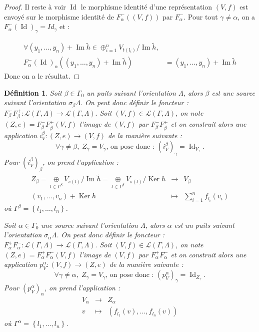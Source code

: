 \documentclass[a4paper,10pt]{article}
\newtheorem{defi}[]{Définition}[section]
\DeclareMathOperator{\Ker}{Ker}
\DeclareMathOperator{\Id}{Id}
\DeclareMathOperator{\Img}{Im}
\begin{document}
\begin{proof}
 Il reste à voir $\Id$ le morphisme identité d'une représentation $(V,f)$ est envoyé sur le morphisme identité de $F^{-}_{\alpha}((V,f))$ par $F^{-}_{\alpha}$. Pour tout $\gamma \neq \alpha$, on a $F^{-}_{\alpha}(\Id)_{\gamma} = Id_{\gamma}$ et : 

\[
\begin{array}{rl}
  \forall (y_{1}, \dots, y_{n}) + \Img \widetilde{h} \in \oplus_{i=1}^{n} V_{t(l_{i})} / \Img \widetilde{h},& \\
F^{-}_{\alpha}(\Id)_{\alpha}((y_{1}, \dots, y_{n}) + \Img \widetilde{h}) &= (y_{1}, \dots, y_{n}) + \Img \widetilde{h}
\end{array}
\]
Donc on a le résultat.
\end{proof}

\begin{defi}
	Soit $\beta\in\Gamma_{0}$ un puits suivant l'orientation $\Lambda$, alors $\beta$ est une source suivant l'orientation $\sigma_{\beta}\Lambda$. On peut donc définir le foncteur : $F_{\beta}^{-}F_{\beta}^{+}:\mathscr{L}(\Gamma,\Lambda)\rightarrow\mathscr{L}(\Gamma,\Lambda).$ Soit $(V,f)\in\mathscr{L}(\Gamma,\Lambda)$, on note $(Z,e)=F_{\beta}^{-}F_{\beta}^{+}(V,f)$ l'image de $(V,f)$ par $F_{\beta}^{-}F_{\beta}^{+}$ et on construit alors une application $i_{V}^{\beta}:(Z,e)\rightarrow (V,f)$ de la manière suivante :
	\[
		\forall \gamma\neq\beta,\;Z_{\gamma}=V_{\gamma}\text{, on pose donc : }(i_{V}^{\beta})_{\gamma}=\Id_{V_{\gamma}}.
	\]
	Pour $(i_{V}^{\beta})_{\beta}$, on prend l'application : 
	\[
	\begin{array}{ccc}
		Z_{\beta}=\underset{l\in\Gamma^{\beta}}{\oplus} V_{s(l)}/\Img \widetilde{h}=\underset{l\in\Gamma^{\beta}}{\oplus} V_{s(l)}/\Ker h & \rightarrow & V_{\beta} \\
		(v_{1},\dots,v_{n})+\Ker h & \mapsto & \sum_{i=1}^{n}f_{l_{i}}(v_{i})
	\end{array}
	\]
	où $\Gamma^{\beta}=\left\{ l_{1},\dots,l_{n} \right\}$.

        Soit $\alpha\in\Gamma_{0}$ une source suivant l'orientation $\Lambda$, alors $\alpha$ est un puits suivant l'orientation $\sigma_{\alpha}\Lambda$. On peut donc définir le foncteur : $F_{\alpha}^{+}F_{\alpha}^{-}:\mathscr{L}(\Gamma,\Lambda)\rightarrow\mathscr{L}(\Gamma,\Lambda).$ Soit $(V,f)\in\mathscr{L}(\Gamma,\Lambda)$, on note $(Z,e)=F_{\alpha}^{+}F_{\alpha}^{-}(V,f)$ l'image de $(V,f)$ par $F_{\alpha}^{+}F_{\alpha}^{-}$ et on construit alors une application $p_{V}^{\alpha}:  (V,f)\rightarrow (Z,e)$ de la manière suivante :
	\[
		\forall \gamma\neq\alpha,\;Z_{\gamma}=V_{\gamma}\text{, on pose donc : }(p_{V}^{\alpha})_{\gamma}=\Id_{Z_{\gamma}}.
	\]
	Pour $(p_{V}^{\alpha})_{\alpha}$, on prend l'application : 
	\[
	\begin{array}{ccc}
		 V_{\alpha} & \rightarrow & Z_{\alpha} \\
		v & \mapsto & (f_{l_{1}}(v), \dots, f_{l_{n}}(v))
	\end{array}
	\]
	où $\Gamma^{\alpha}=\left\{ l_{1},\dots,l_{n} \right\}$.
\end{defi}
\end{document}
